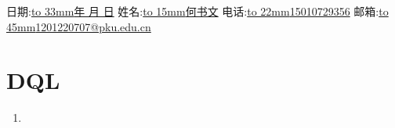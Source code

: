 \documentclass[12pt,oneside,a4paper]{ctexbook} %
\numberwithin{chapter}{part}
\begin{document}
\pagestyle{fancy}
\lfoot{}
\rfoot{}

日期:\underline{\hbox to 33mm{\renewcommand{\today}{\number\year 年 \number\month 月 \number\day 日}\today}}
\qquad 姓名:\underline{\hbox to 15mm{何书文}} 电话:\underline{\hbox to 22mm{15010729356}} 邮箱:\underline{\hbox to 45mm{1201220707@pku.edu.cn}}

% 
\section{DQL}
\begin{enumerate}
\item 
\end{enumerate}
\end{document}
